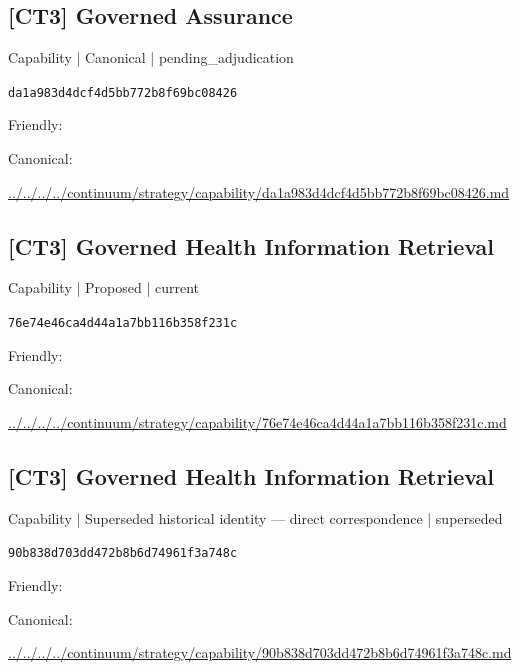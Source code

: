 \documentclass[10pt,a4paper]{article}
\begin{document}
\subsection*{[CT3] Governed Assurance}
{\small Capability | Canonical | pending\_adjudication}\par
\texttt{da1a983d4dcf4d5bb772b8f69bc08426}\par
Friendly: \par
Canonical: \par
{\footnotesize\url{../../../../continuum/strategy/capability/da1a983d4dcf4d5bb772b8f69bc08426.md}}\par
\subsection*{[CT3] Governed Health Information Retrieval}
{\small Capability | Proposed | current}\par
\texttt{76e74e46ca4d44a1a7bb116b358f231c}\par
Friendly: \par
Canonical: \par
{\footnotesize\url{../../../../continuum/strategy/capability/76e74e46ca4d44a1a7bb116b358f231c.md}}\par
\subsection*{[CT3] Governed Health Information Retrieval}
{\small Capability | Superseded historical identity — direct correspondence | superseded}\par
\texttt{90b838d703dd472b8b6d74961f3a748c}\par
Friendly: \par
Canonical: \par
{\footnotesize\url{../../../../continuum/strategy/capability/90b838d703dd472b8b6d74961f3a748c.md}}\par
\end{document}
